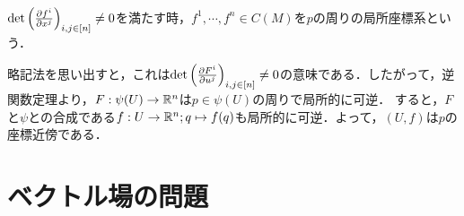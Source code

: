 \documentclass[uplatex,dvipdfmx]{jsreport}
\begin{document}
\begin{definition}
    $\det\left(\frac{\partial f^i}{\partial x^j}\right)_{i,j\in[n]}\ne 0$を満たす時，$f^1,\cdots,f^n\in C(M)$を$p$の周りの局所座標系という．
\end{definition}
\begin{remarks}
    略記法を思い出すと，これは$\det\left(\frac{\partial F^i}{\partial u^j}\right)_{i,j\in[n]}\ne 0$の意味である．したがって，逆関数定理より，$F:\psi(U)\to\mathbb{R}^n$は$p\in\psi(U)$の周りで局所的に可逆．
    すると，$F$と$\psi$との合成である$f:U\to\mathbb{R}^n;q\mapsto f(q)$も局所的に可逆．よって，$(U,f)$は$p$の座標近傍である．
\end{remarks}

\section{ベクトル場の問題}
\end{document}
